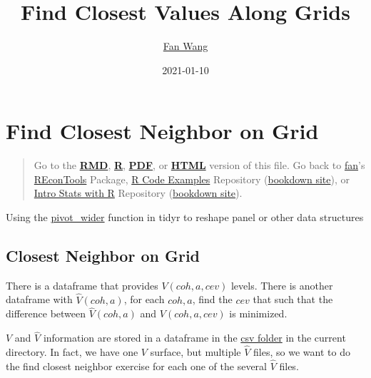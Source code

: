 \documentclass[
]{article}
\title{Find Closest Values Along Grids}
\author{\href{https://fanwangecon.github.io}{Fan Wang}}
\date{2021-01-10}
\begin{document}
\maketitle

{
\hypersetup{linkcolor=}
\setcounter{tocdepth}{3}
\tableofcontents
}
\hypertarget{find-closest-neighbor-on-grid}{%
\section{Find Closest Neighbor on
Grid}\label{find-closest-neighbor-on-grid}}

\begin{quote}
Go to the
\href{https://github.com/FanWangEcon//R4Econ/blob/master/panel/join//fs_join_compare.Rmd}{\textbf{RMD}},
\href{https://github.com/FanWangEcon//R4Econ/blob/master/panel/join//htmlpdfr/fs_join_compare.R}{\textbf{R}},
\href{https://github.com/FanWangEcon//R4Econ/blob/master/panel/join//htmlpdfr/fs_join_compare.pdf}{\textbf{PDF}},
or
\href{https://fanwangecon.github.io//R4Econ/panel/join//htmlpdfr/fs_join_compare.html}{\textbf{HTML}}
version of this file. Go back to
\href{http://fanwangecon.github.io/}{fan}'s
\href{https://fanwangecon.github.io/REconTools/}{REconTools} Package,
\href{https://fanwangecon.github.io/R4Econ/}{R Code Examples} Repository
(\href{https://fanwangecon.github.io/R4Econ/bookdown}{bookdown site}),
or \href{https://fanwangecon.github.io/Stat4Econ/}{Intro Stats with R}
Repository
(\href{https://fanwangecon.github.io/Stat4Econ/bookdown}{bookdown
site}).
\end{quote}

Using the
\href{https://tidyr.tidyverse.org/reference/pivot_wider.html}{pivot\_wider}
function in tidyr to reshape panel or other data structures

\hypertarget{closest-neighbor-on-grid}{%
\subsection{Closest Neighbor on Grid}\label{closest-neighbor-on-grid}}

There is a dataframe that provides \(V(coh, a, cev)\) levels. There is
another dataframe with \(\hat{V}(coh, a)\), for each \(coh, a\), find
the \(cev\) that such that the difference between \(\hat{V}(coh, a)\)
and \(V(coh, a, cev)\) is minimized.

\(V\) and \(\hat{V}\) information are stored in a dataframe in the
\href{https://github.com/FanWangEcon/R4Econ/tree/master/panel/join/_file/csv}{csv
folder} in the current directory. In fact, we have one \(V\) surface,
but multiple \(\hat{V}\) files, so we want to do the find closest
neighbor exercise for each one of the several \(\hat{V}\) files.
\end{document}
